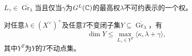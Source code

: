 \begin{note}[L21S2O6]
$L_\gamma\in\overline{\operatorname{Gr}_\lambda}$当且仅当$\gamma$为$G^L(\mathbb{C})$的最高权$\lambda$不可约表示的一个权。
\end{note}
\begin{corollary}\label{L21S2O7}
对任意$\lambda\in(X^\vee)^+$及任意$T$不变闭子集$Y\subseteq\overline{\operatorname{Gr}_\lambda}$，有
\[\dim Y\le\max_{L_\gamma\in Y^T}\langle\kappa,\lambda+\gamma\rangle,\]
其中$Y^T$为$Y$的$T$不动点集。
\end{corollary}
